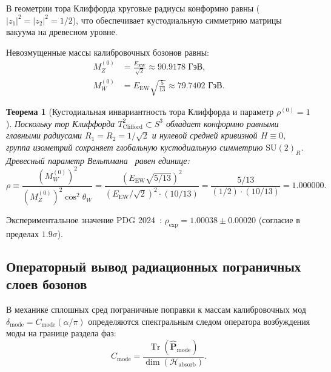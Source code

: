 \documentclass[11pt,a4paper]{article}
\newtheorem{theorem}{Теорема}
\theoremstyle{definition}
\theoremstyle{remark}
\begin{document}
В геометрии тора Клиффорда круговые радиусы конформно равны ($|z_1|^2 = |z_2|^2 = 1/2$), что обеспечивает кустодиальную симметрию матрицы вакуума на древесном уровне.
	
Невозмущенные массы калибровочных бозонов равны:
\begin{align}
	M_Z^{(0)} &= \frac{E_{\mathrm{EW}}}{\sqrt{2}} \approx 90.9178\text{ ГэВ}, \label{eq:m_z_bare_exact} \\
	M_W^{(0)} &= E_{\mathrm{EW}} \sqrt{\frac{5}{13}} \approx 79.7402\text{ ГэВ}. \label{eq:m_w_bare_exact}
\end{align}
	
\begin{theorem}[Кустодиальная инвариантность тора Клиффорда и параметр $\rho^{(0)} = 1$]
\label{thm:custodial_symmetry_clifford}
Поскольку тор Клиффорда $T^2_{\mathrm{Clifford}} \subset S^3$ обладает конформно равными главными радиусами $R_1 = R_2 = 1/\sqrt{2}$ и нулевой средней кривизной $H \equiv 0$, группа изометрий сохраняет глобальную кустодиальную симметрию $\mathrm{SU}(2)_R$. Древесный параметр Вельтмана~\cite{Veltman1977} равен единице:
\begin{equation}
	\rho \equiv \frac{\left(M_W^{(0)}\right)^2}{\left(M_Z^{(0)}\right)^2 \cos^2\theta_W} = \frac{\left(E_{\mathrm{EW}}\sqrt{5/13}\right)^2}{\left(E_{\mathrm{EW}}/\sqrt{2}\right)^2 \cdot (10/13)} = \frac{5/13}{(1/2) \cdot (10/13)} = 1.000000.
\label{eq:rho_tree_exact}
\end{equation}
\end{theorem}
Экспериментальное значение PDG 2024~\cite{PDG2024}: $\rho_{\mathrm{exp}} = 1.00038 \pm 0.00020$ (согласие в пределах $1.9\sigma$).
	
\subsection{Операторный вывод радиационных пограничных слоев бозонов}

В механике сплошных сред пограничные поправки к массам калибровочных мод $\delta_{\mathrm{mode}} = C_{\mathrm{mode}} (\alpha/\pi)$ определяются спектральным следом оператора возбуждения моды на границе раздела фаз:
\begin{equation}
    C_{\mathrm{mode}} = \frac{\operatorname{Tr}(\hat{\mathbf{P}}_{\mathrm{mode}})}{\dim(\mathcal{H}_{\mathrm{absorb}})}.
    \label{eq:operator_trace_general_formula}
\end{equation}
\end{document}
